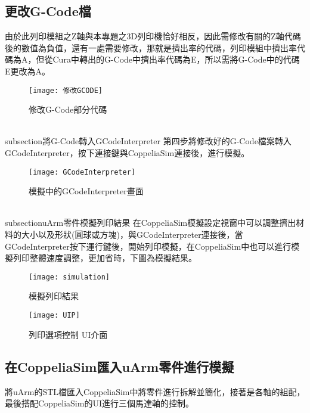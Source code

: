 \subsection{更改G-Code檔}
 由於此列印模組之Z軸與本專題之3D列印機恰好相反，因此需修改有關的Z軸代碼後的數值為負值，還有一處需要修改，那就是擠出率的代碼，列印模組中擠出率代碼為A，但從Cura中轉出的G-Code中擠出率代碼為E，所以需將G-Code中的代碼E更改為A。
\begin{figure}[hbt!]
\begin{center}
\texttt{[image: 修改GCODE]}
\caption{\Large 修改G-Code部分代碼}\label{修改GCODE}
\end{center}
\end{figure}
\\subsection{將G-Code轉入GCodeInterpreter}
 第四步將修改好的G-Code檔案轉入GCodeInterpreter，按下連接鍵與CoppeliaSim連接後，進行模擬。\\
\begin{figure}[hbt!]
\begin{center}
\texttt{[image: GCodeInterpreter]}
\caption{\Large 模擬中的GCodeInterpreter畫面}\label{GCodeInterpreter}
\end{center}
\end{figure}
\\subsection{uArm零件模擬列印結果}
 在CoppeliaSim模擬設定視窗中可以調整擠出材料的大小以及形狀(圓球或方塊)，與GCodeInterpreter連接後，當GCodeInterpreter按下運行鍵後，開始列印模擬，在CoppeliaSim中也可以進行模擬列印整體速度調整，更加省時，下圖為模擬結果。\\
\begin{figure}[hbt!]
\begin{center}
\texttt{[image: simulation]}
\caption{\Large 模擬列印結果}\label{simulation}
\end{center}
\end{figure}

\begin{figure}[hbt!]
\begin{center}
\texttt{[image: UIP]}
\caption{\Large 列印選項控制 UI介面}\label{UIP}
\end{center}
\end{figure}

\subsection{在CoppeliaSim匯入uArm零件進行模擬}
 將uArm的STL檔匯入CoppeliaSim中將零件進行拆解並簡化，接著是各軸的組配，最後搭配CoppeliaSim的UI進行三個馬達軸的控制。\\
 
